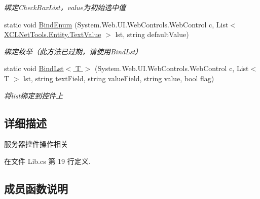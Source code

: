 \begin{DoxyCompactItemize}
\begin{DoxyCompactList}\small\item\em 绑定\+Check\+Box\+List，value为初始选中值 \end{DoxyCompactList}\item 
static void \hyperlink{class_x_c_l_net_tools_1_1_control_1_1_server_control_1_1_lib_acf0e494ba2e94742818fbebfd883ab17}{Bind\+Enum} (System.\+Web.\+U\+I.\+Web\+Controls.\+Web\+Control c, List$<$ \hyperlink{class_x_c_l_net_tools_1_1_entity_1_1_text_value}{X\+C\+L\+Net\+Tools.\+Entity.\+Text\+Value} $>$ lst, string default\+Value)
\begin{DoxyCompactList}\small\item\em 绑定枚举（此方法已过期，请使用\+Bind\+Lst） \end{DoxyCompactList}\item 
static void \hyperlink{class_x_c_l_net_tools_1_1_control_1_1_server_control_1_1_lib_ad5ebfd4eb97120e0049cd0260e150ed9}{Bind\+Lst$<$ T $>$} (System.\+Web.\+U\+I.\+Web\+Controls.\+Web\+Control c, List$<$ T $>$ lst, string text\+Field, string value\+Field, string value, bool flag)
\begin{DoxyCompactList}\small\item\em 将list绑定到控件上 \end{DoxyCompactList}\end{DoxyCompactItemize}


\subsection{详细描述}
服务器控件操作相关 



在文件 Lib.\+cs 第 19 行定义.



\subsection{成员函数说明}
